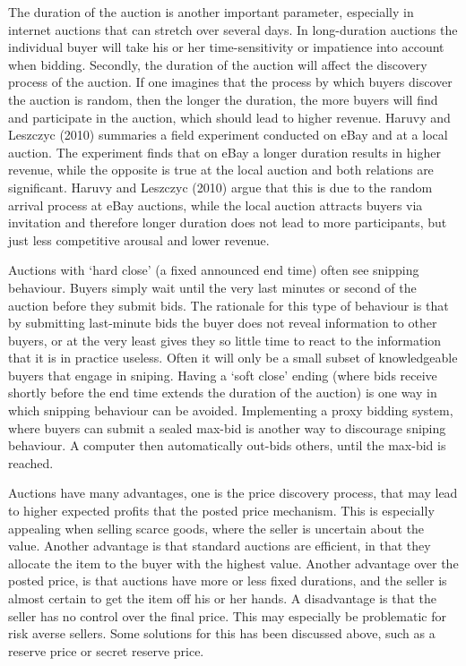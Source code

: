 \documentclass[a4paper,12pt]{article}
\begin{document}
	The duration of the auction is another important parameter, especially in internet auctions that can stretch over several days. In long-duration auctions the individual buyer will take his or her time-sensitivity or impatience into account when bidding. Secondly, the duration of the auction will affect the discovery process of the auction. If one imagines that the process by which buyers discover the auction is random, then the longer the duration, the more buyers will find and participate in the auction, which should lead to higher revenue. Haruvy and Leszczyc (2010) summaries a field experiment conducted on eBay and at a local auction. The experiment finds that on eBay a longer duration results in higher revenue, while the opposite is true at the local auction and both relations are significant. Haruvy and Leszczyc (2010) argue that this is due to the random arrival process at eBay auctions, while the local auction attracts buyers via invitation and therefore longer duration does not lead to more participants, but just less competitive arousal and lower revenue. 

	Auctions with `hard close' (a fixed announced end time) often see snipping behaviour. Buyers simply wait until the very last minutes or second of the auction before they submit bids. The rationale for this type of behaviour is that by submitting last-minute bids the buyer does not reveal information to other buyers, or at the very least gives they so little time to react to the information that it is in practice useless. Often it will only be a small subset of knowledgeable buyers that engage in sniping. Having a `soft close' ending (where bids receive shortly before the end time extends the duration of the auction) is one way in which snipping behaviour can be avoided. Implementing a proxy bidding system, where buyers can submit a sealed max-bid is another way to discourage sniping behaviour. A computer then automatically out-bids others, until the max-bid is reached.

	Auctions have many advantages, one is the price discovery process, that may lead to higher expected profits that the posted price mechanism. This is especially appealing when selling scarce goods, where the seller is uncertain about the value. Another advantage is that standard auctions are efficient, in that they allocate the item to the buyer with the highest value. Another advantage over the posted price, is that auctions have more or less fixed durations, and the seller is almost certain to get the item off his or her hands. A disadvantage is that the seller has no control over the final price. This may especially be problematic for risk averse sellers. Some solutions for this has been discussed above, such as a reserve price or secret reserve price.
\end{document}
